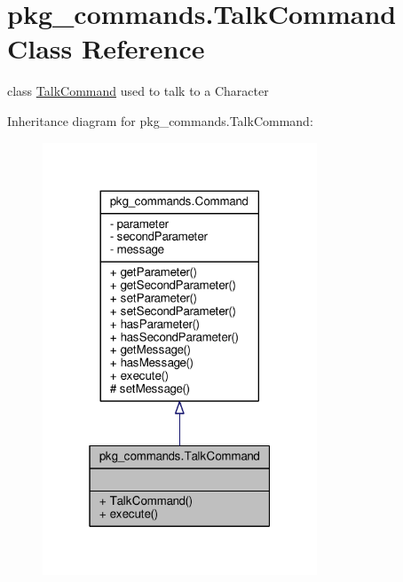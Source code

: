 \hypertarget{classpkg__commands_1_1TalkCommand}{\section{pkg\-\_\-commands.\-Talk\-Command Class Reference}
\label{classpkg__commands_1_1TalkCommand}
}


class \hyperlink{classpkg__commands_1_1TalkCommand}{Talk\-Command} used to talk to a Character  




Inheritance diagram for pkg\-\_\-commands.\-Talk\-Command\-:\nopagebreak
\begin{figure}[H]
\begin{center}
\leavevmode
\includegraphics[width=232pt]{classpkg__commands_1_1TalkCommand__inherit__graph}
\end{center}
\end{figure}


